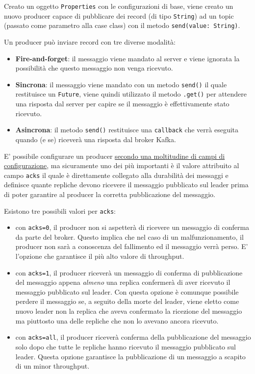 \documentclass[]{article}
\providecommand{\tightlist}{%
  \setlength{\itemsep}{0pt}\setlength{\parskip}{0pt}}
\begin{document}
\normalsize
\newpage

Creato un oggetto \texttt{Properties} con le configurazioni di base,
viene creato un nuovo producer capace di pubblicare dei record (di tipo
\texttt{String}) ad un topic (passato come parametro alla case class)
con il metodo \texttt{send(value:\ String)}.

Un producer può inviare record con tre diverse modalità:

\begin{itemize}
\tightlist
\item
  \textbf{Fire-and-forget}: il messaggio viene mandato al server e viene
  ignorata la possibilità che questo messaggio non venga ricevuto.
\item
  \textbf{Sincrona}: il messaggio viene mandato con un metodo
  \texttt{send()} il quale restituisce un \texttt{Future}, viene quindi
  utilizzato il metodo \texttt{.get()} per attendere una risposta dal
  server per capire se il messaggio è effettivamente stato ricevuto.
\item
  \textbf{Asincrona}: il metodo \texttt{send()} restituisce una
  \texttt{callback} che verrà eseguita quando (e se) riceverà una
  risposta dal broker Kafka.
\end{itemize}

E' possibile configurare un producer
\href{https://kafka.apache.org/documentation.html\#producerconfigs}{secondo
una moltitudine di campi di configurazione}, ma sicuramente uno dei più
importanti è il valore attribuito al campo \texttt{acks} il quale è
direttamente collegato alla durabilità dei messaggi e definisce quante
repliche devono ricevere il messaggio pubblicato sul leader prima di
poter garantire al producer la corretta pubblicazione del messaggio.

Esistono tre possibili valori per \texttt{acks}:

\begin{itemize}
\tightlist
\item
  con \texttt{acks=0}, il producer non si aspetterà di ricevere un
  messaggio di conferma da parte del broker. Questo implica che nel caso
  di un malfunzionamento, il producer non sarà a conoscenza del
  fallimento ed il messaggio verrà perso. E' l'opzione che garantisce il
  più alto valore di throughput.
\item
  con \texttt{acks=1}, il producer riceverà un messaggio di conferma di
  pubblicazione del messaggio appena \emph{almeno} una replica
  confermerà di aver ricevuto il messaggio pubblicato sul leader. Con
  questa opzione è comunque possibile perdere il messaggio se, a seguito
  della morte del leader, viene eletto come nuovo leader non la replica
  che aveva confermato la ricezione del messaggio ma piuttosto una delle
  repliche che non lo avevano ancora ricevuto.
\item
  con \texttt{acks=all}, il producer riceverà conferma della
  pubblicazione del messaggio solo dopo che tutte le repliche hanno
  ricevuto il messaggio pubblicato sul leader. Questa opzione garantisce
  la pubblicazione di un messaggio a scapito di un minor throughput.
\end{itemize}
\end{document}
